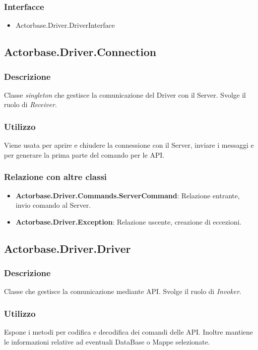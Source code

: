 \documentclass[a4paper]{article}
\begin{document}
		\subsubsection{Interfacce}
			\begin{itemize}
				\item Actorbase.Driver.DriverInterface
			\end{itemize}
		
		\subsection{Actorbase.Driver.Connection}
		
		\subsubsection{Descrizione}
			Classe \emph{singleton} che gestisce la comunicazione del Driver con il Server. Svolge il ruolo di \emph{Receiver}.
		\subsubsection{Utilizzo}
			Viene usata per aprire e chiudere la connessione con il Server, inviare i messaggi e per generare la prima parte del comando per le API.
		\subsubsection{Relazione con altre classi}
			\begin{itemize}
				\item \textbf{Actorbase.Driver.Commands.ServerCommand}: Relazione entrante, invio comando al Server.
				\item \textbf{Actorbase.Driver.Exception}: Relazione uscente, creazione di eccezioni.
			\end{itemize}
		
		\subsection{Actorbase.Driver.Driver}
		
		\subsubsection{Descrizione}
			Classe che gestisce la comunicazione mediante API. Svolge il ruolo di \emph{Invoker}.
		\subsubsection{Utilizzo}
			Espone i metodi per codifica e decodifica dei comandi delle API. Inoltre mantiene le informazioni relative ad eventuali DataBase o Mappe selezionate.
\end{document}
